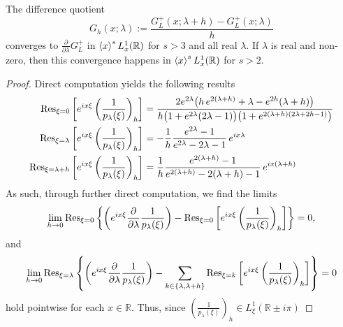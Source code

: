 \documentclass[../dissertation]{subfiles}
\begin{document}
\begin{prop}\label{prop2:ghconv}
	The dif{}ference quotient
	\[
		G_h(x; \lambda) := \frac{G_L^+(x; \lambda+h) - G_L^+(x; \lambda)}{h}
	\]
	converges to $\frac{\partial}{\partial \lambda} G_L^+$ in 
	$\left\langle x \right\rangle^s L_x^1(\mathbb R)$ for $s > 3$ and all real $\lambda$. 
	If $\lambda$ is real and non-zero, then 
	this convergence happens in $\left\langle x \right\rangle^s L_x^1(\mathbb R)$ for 
	$s > 2$.
\end{prop}
\begin{proof}
	Direct computation yields the following results
	\begin{align*}
		\operatorname{Res}_{\xi=0}
				\left[
					e^{ix\xi}
					\left(
						\frac{1}{p_\lambda(\xi)}
					\right)_h
				\right]
			&= 
				\frac{
					2 e^{2\lambda}
					\big(
						h \, e^{2(\lambda+h)} 
						+ \lambda 
						- e^{2h}(\lambda + h)
					\big)
				}{
					h 
					\big(
						1 + e^{2\lambda}(2\lambda - 1)
					\big)
					\big(
						1 + e^{2(\lambda+h)(2\lambda + 2h - 1)}
					\big)
				} \\
		\operatorname{Res}_{\xi=\lambda}
				\left[
					e^{ix\xi}
					\left(
						\frac{1}{p_\lambda(\xi)}
					\right)_h
				\right]
			&= - \frac{1}{h}\frac{e^{2\lambda}-1}{e^{2\lambda}-2\lambda-1}
				\, e^{ix\lambda} \\
		\operatorname{Res}_{\xi=\lambda+h}
				\left[
					e^{ix\xi}
					\left(
						\frac{1}{p_\lambda(\xi)}
					\right)_h
				\right]
			&= 
				 \frac{1}{h}
				 \frac{e^{2(\lambda+h)}-1}{e^{2(\lambda+h)}-2(\lambda+h)-1}
				\, e^{ix(\lambda+h)}
	\end{align*}
	As such, through further direct computation, we find the
	limits
	\begin{align*}
		\lim_{h\to0}
			\operatorname{Res}_{\xi=0}
				\left\{ 
				\left(
					e^{ix\xi}
					\frac{\partial}{\partial \lambda}
						\frac{1}{p_\lambda(\xi)}
				\right)
				-
				\operatorname{Res}_{\xi=0}
				\left[
					e^{ix\xi}
					\left(
						\frac{1}{p_\lambda(\xi)}
					\right)_h
				\right]
				\right\}
			=0,
	\end{align*}
	and
	\begin{align*}
		\lim_{h\to0}
			\operatorname{Res}_{\xi=\lambda}
				\left\{ 
				\left(
					e^{ix\xi}
					\frac{\partial}{\partial \lambda}
						\frac{1}{p_\lambda(\xi)}
				\right)
				-
				\sum_{k \in \{\lambda, \lambda+h\}}
				\operatorname{Res}_{\xi=k}
				\left[
					e^{ix\xi}
					\left(
						\frac{1}{p_\lambda(\xi)}
					\right)_h
				\right]
				\right\}
			=0
	\end{align*}
	hold pointwise for each $x \in \mathbb R$. Thus, since
	$\left(\frac{1}{p_\lambda(\xi)}\right)_h \in L_\xi^1(\mathbb R \pm i\pi)$

\end{proof}
\end{document}
